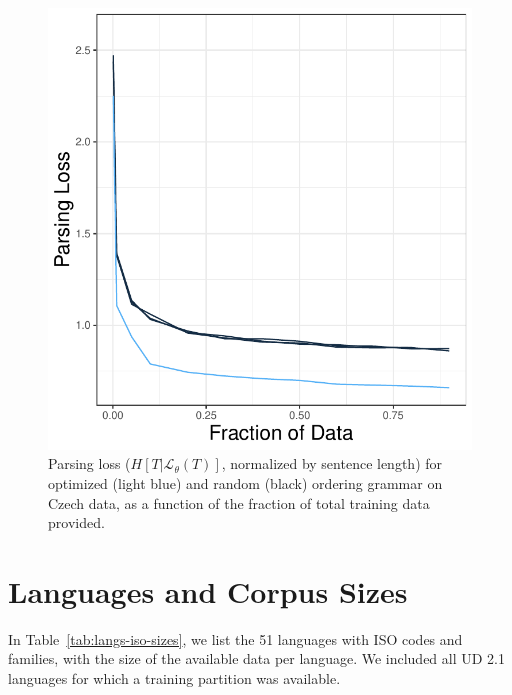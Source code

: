 \documentclass[10pt,twoside,lineno]{article}
\begin{document}
\begin{figure}[ht]
    \centering
    \includegraphics[scale=.4]{../results/learning-curves/figures/learning-parser-czech-logloss.pdf} 

        \caption{Parsing loss ($H[T|\mathcal{L}_\theta(T)]$, normalized by sentence length) for optimized (light blue) and random (black) ordering grammar on Czech data, as a function of the fraction of total training data provided.}
    \label{fig:learning-czech}
\end{figure}











\section{Languages and Corpus Sizes}
In Table~\ref{tab:langs-iso-sizes}, we list the 51 languages with ISO codes and families, with the size of the available data per language.
We included all UD 2.1 languages for which a training partition was available.
\end{document}
